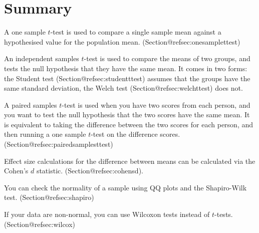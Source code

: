 \section{Summary}

 \itemsep -2pt
\item A one sample $t$-test is used to compare a single sample mean against a hypothesised value for the population mean. (Section@refsec:onesamplettest)
\item An independent samples $t$-test is used to compare the means of two groups, and tests the null hypothesis that they have the same mean. It comes in two forms: the Student test (Section@refsec:studentttest) assumes that the groups have the same standard deviation, the Welch test (Section@refsec:welchttest) does not.
\item A paired samples $t$-test is used when you have two scores from each person, and you want to test the null hypothesis that the two scores have the same mean. It is equivalent to taking the difference between the two scores for each person, and then running a one sample $t$-test on the difference scores. (Section@refsec:pairedsamplesttest)
\item Effect size calculations for the difference between means can be calculated via the Cohen's $d$ statistic. (Section@refsec:cohensd).
\item You can check the normality of a sample using QQ plots and the Shapiro-Wilk test. (Section@refsec:shapiro)
\item If your data are non-normal, you can use Wilcoxon tests instead of $t$-tests. (Section@refsec:wilcox)



